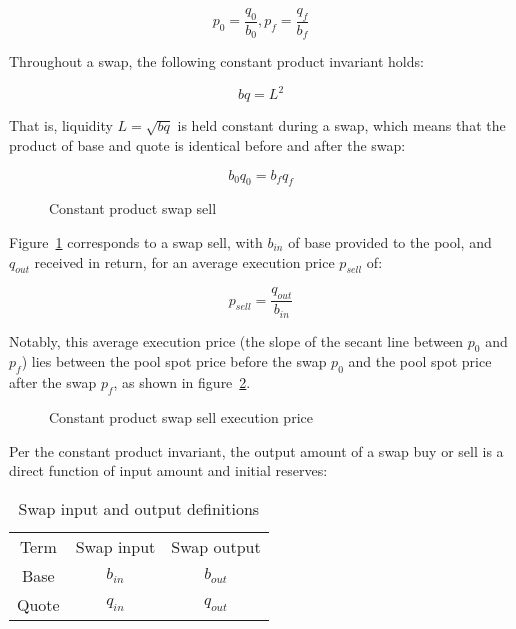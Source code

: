 \documentclass[table, twocolumn]{article}
\begin{document}
\begin{equation}
  p_0 = \frac{q_0}{b_0},
  p_f = \frac{q_f}{b_f}
\end{equation}

Throughout a swap, the following constant product invariant holds:

\begin{equation} \label{eqn:liquidity}
  b q = L^2
\end{equation}

That is, liquidity $L = \sqrt{bq}$ is held constant during a swap, which means that the product of
base and quote is identical before and after the swap:

\begin{equation} \label{eqn:liquidity}
  b_0 q_0 = b_f q_f
\end{equation}

\begin{figure}[ht]
  \centering
  
  \caption{Constant product swap sell}
  \label{fig:cpmm-swap-sell}
\end{figure}

Figure~\ref{fig:cpmm-swap-sell} corresponds to a swap sell, with $b_{in}$ of base provided to the
pool, and $q_{out}$ received in return, for an average execution price $p_{sell}$ of:

\begin{equation} \label{eqn:liquidity}
  p_{sell} = \frac{q_{out}}{b_{in}}
\end{equation}

Notably, this average execution price (the slope of the secant line between $p_0$ and $p_f$) lies
between the pool spot price before the swap $p_0$ and the pool spot price after the swap $p_f$, as
shown in figure~\ref{fig:cpmm-swap-sell-price}.

\begin{figure}[ht]
  \centering
  
  \caption{Constant product swap sell execution price}
  \label{fig:cpmm-swap-sell-price}
\end{figure}

Per the constant product invariant, the output amount of a swap buy or sell is a direct function of
input amount and initial reserves:

\begin{table}[ht]
  \centering
  \begin{tabular}{|c|c|c|}
    \hline
    \rowcolor{cyan}
    Term  & Swap input & Swap output \\
    Base  & $b_{in}$   & $b_{out}$   \\
    Quote & $q_{in}$   & $q_{out}$   \\
    \hline
  \end{tabular}
  \caption{Swap input and output definitions}
  \label{tab:spot-before-after-swap}
\end{table}
\end{document}
